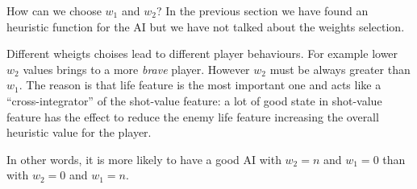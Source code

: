 How can we choose $w_1$ and $w_2$? In the previous section we have found an heuristic
function for the AI but we have not talked about the weights selection.

Different wheigts choises lead to different player behaviours. For example lower $w_2$
values brings to a more \emph{brave} player. However $w_2$ must be always greater than
$w_1$. The reason is that life feature is the most important one and acts like a
``cross-integrator'' of the shot-value feature: a lot of good state in shot-value feature
has the effect to reduce the enemy life feature increasing the overall heuristic value for
the player.

In other words, it is more likely to have a good AI with $w_2=n$ and $w_1=0$ than with $w_2=0$
and $w_1=n$.
